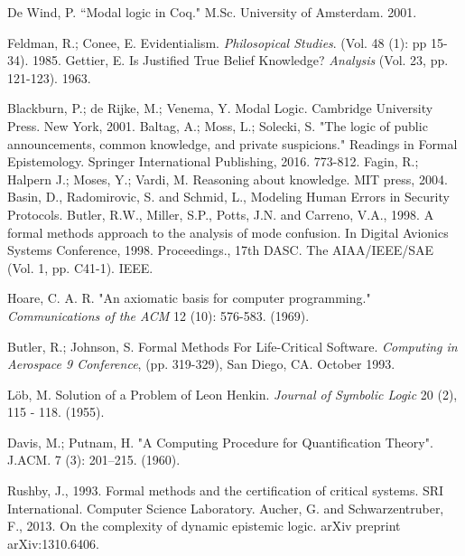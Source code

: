 \begin{thebibliography}{9}
	 	De Wind, P. ``Modal logic in Coq." M.Sc. University of Amsterdam. 2001.
	 	
	 	Feldman, R.; Conee, E. Evidentialism. {\em Philosopical Studies}. (Vol. 48 (1): pp 15-34). 1985.
	 	Gettier, E. Is Justified True Belief Knowledge? {\em Analysis} (Vol. 23, pp. 121-123). 1963.
	 	
	 	 Blackburn, P.; de Rijke, M.; Venema, Y. Modal Logic. Cambridge University Press. New York, 2001.
	 	 Baltag, A.; Moss, L.; Solecki, S. "The logic of public announcements, common knowledge, and private suspicions." Readings in Formal Epistemology. Springer International Publishing, 2016. 773-812.
	 	 Fagin, R.; Halpern J.; Moses, Y.; Vardi, M. Reasoning about knowledge. MIT press, 2004.
	 	 Basin, D., Radomirovic, S. and Schmid, L., Modeling Human Errors in Security Protocols.
	 	 Butler, R.W., Miller, S.P., Potts, J.N. and Carreno, V.A., 1998. A formal methods approach to the analysis of mode confusion. In Digital Avionics Systems Conference, 1998. Proceedings., 17th DASC. The AIAA/IEEE/SAE (Vol. 1, pp. C41-1). IEEE.
	 	
	 	Hoare, C. A. R. "An axiomatic basis for computer programming." \emph{Communications of the ACM} 12 (10): 576-583. (1969).
	 	
	 	Butler, R.; Johnson, S. Formal Methods For Life-Critical Software. \emph{Computing in Aerospace 9 Conference}, (pp. 319-329), San Diego, CA. October 1993.
	 	
	 	L\"ob, M. Solution of a Problem of Leon Henkin. {\em Journal of Symbolic Logic} 20 (2), 115 - 118. (1955).
	 	
	 	Davis, M.; Putnam, H. "A Computing Procedure for Quantification Theory". J.ACM. 7 (3): 201–215. (1960).
	 	
	 	 Rushby, J., 1993. Formal methods and the certification of critical systems. SRI International. Computer Science Laboratory.
	 	 Aucher, G. and Schwarzentruber, F., 2013. On the complexity of dynamic epistemic logic. arXiv preprint arXiv:1310.6406.
	 	
	 	

\end{thebibliography}
